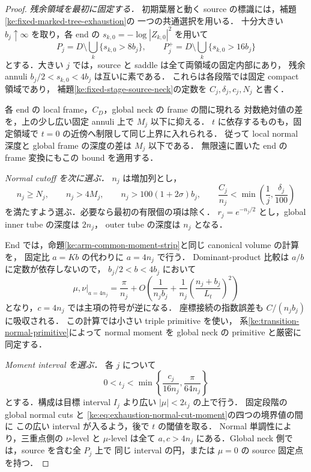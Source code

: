 \begin{proof}
\emph{残余領域を最初に固定する．}
初期葉層と動く source の標識には，補題\ref{ke:fixed-marked-tree-exhaustion}の
一つの共通選択を用いる．
十分大きい $b_j\uparrow\infty$ を取り，各 end の
$s_{k,0}=-\log|Z_{k,0}|^2$ を用いて
\[
 P_j=D\setminus\bigcup_k\{s_{k,0}>8b_j\},\qquad
 P_j^+=D\setminus\bigcup_k\{s_{k,0}>16b_j\}
\]
とする．大きい $j$ では，source と saddle は全て両領域の固定内部にあり，
残余 annuli $b_j/2<s_{k,0}<4b_j$ は互いに素である．
これらは各段階では固定 compact 領域であり，
補題\ref{ke:fixed-stage-source-neck}の定数を
$C_j,\delta_j,c_j,N_j$ と書く．

各 end の local frame，$C_D$，global neck の frame の間に現れる
対数絶対値の差を，上の少し広い固定 annuli 上で $M_j$ 以下に抑える．
$t$ に依存するものも，固定領域で $t=0$ の近傍へ制限して同じ上界に入れられる．
従って local normal 深度と global frame の深度の差は $M_j$ 以下である．
無限遠に置いた end の frame 変換にもこの bound を適用する．

\emph{Normal cutoff を次に選ぶ．}
$n_j$ は増加列とし，
\[
 n_j\ge N_j,\qquad n_j>4M_j,\qquad
 n_j>100(1+2\sigma)b_j,\qquad
 \frac{C_j}{n_j}<\min\left(\frac1j,\frac{\delta_j}{100}\right)
\]
を満たすよう選ぶ．必要なら最初の有限個の項は除く．
$r_j=e^{-n_j/2}$ とし，global inner tube の深度は $2n_j$，
outer tube の深度は $n_j$ となる．

End では，命題\ref{ke:arm-common-moment-strip}と同じ canonical volume の計算を，
固定比 $a=Kb$ の代わりに $a=4n_j$ で行う．
Dominant-product 比較は $a/b$ に定数が依存しないので，
$b_j/2<b<4b_j$ において
\begin{equation}\label{ke:eq:exhaustion-normal-cut-moment}
 \mu,\nu\big|_{a=4n_j}
 =\frac{\pi}{n_j}
  +O\left(\frac1{n_jb_j}
         +\frac1{n_j}\left(\frac{n_j+b_j}{L_t}\right)^2\right)
\end{equation}
となり，$c=4n_j$ では主項の符号が逆になる．
座標接続の指数誤差も $C/(n_jb_j)$ に吸収される．
この計算では小さい triple primitive を使い，
系\ref{ke:transition-normal-primitive}によって normal moment を global neck の
primitive と厳密に同定する．

\emph{Moment interval を選ぶ．}
各 $j$ について
\[
 0<\iota_j<\min\left\{\frac{c_j}{16n_j},\frac{\pi}{64n_j}\right\}
\]
とする．構成は目標 interval $I_j$ より広い $|\mu|<2\iota_j$ の上で行う．
固定段階の global normal cuts と
\eqref{ke:eq:exhaustion-normal-cut-moment}の四つの境界値の間に
この広い interval が入るよう，後で $t$ の閾値を取る．
Normal 単調性により，三重点側の $\nu$-level と $\mu$-level は全て
$a,c>4n_j$ にある．Global neck 側では，source を含む全 $P_j$ 上で
同じ interval の円，または $\mu=0$ の source 固定点を持つ．


\end{proof}
